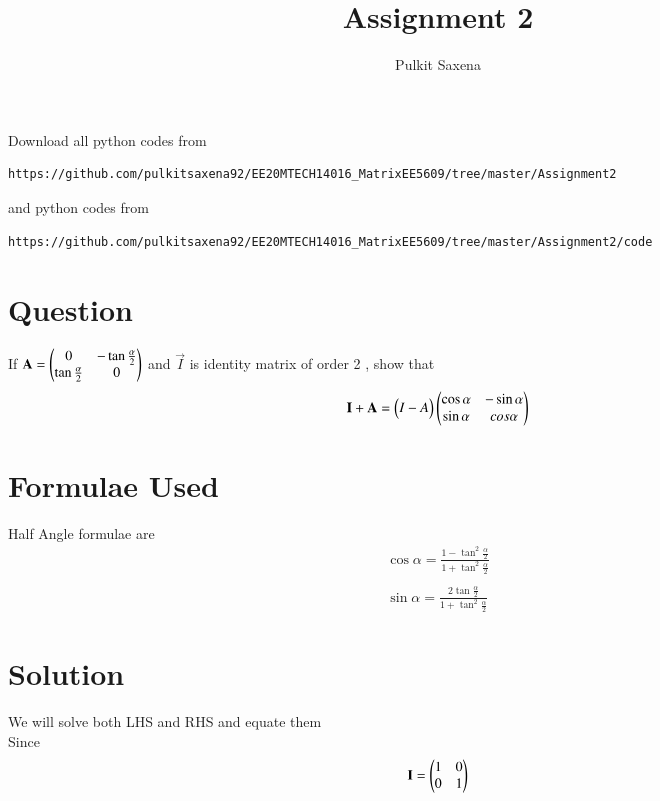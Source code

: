 \documentclass[journal,12pt,onecolumn]{IEEEtran}
\begin{document}
     \def\rightbox#1{\makebox[0in][r]{#1}}
     \def\centbox#1{\makebox[0in]{#1}}
     \def\topbox#1{\raisebox{-\baselineskip}[0in][0in]{#1}}
     \def\midbox#1{\raisebox{-0.5\baselineskip}[0in][0in]{#1}}
\vspace{3cm}
\title{Assignment 2}
\author{Pulkit Saxena}
\maketitle
\bigskip
\renewcommand{\thefigure}{1}
\renewcommand{\thetable}{\theenumi}
Download all python codes from 
\begin{lstlisting}
https://github.com/pulkitsaxena92/EE20MTECH14016_MatrixEE5609/tree/master/Assignment2
\end{lstlisting}
%
and python codes from 
%
\begin{lstlisting}
https://github.com/pulkitsaxena92/EE20MTECH14016_MatrixEE5609/tree/master/Assignment2/code
\end{lstlisting}
\section{\textbf{Question}}
If $\mathbf{A}=\begin{pmatrix}0 & -\tan\frac{\alpha}{2} \\ \tan\frac{\alpha}{2} & 0 \end{pmatrix}$ and $\vec{I}$ is identity matrix of order 2 , show that
\begin{align}
  \mathbf{I}+\mathbf{A}=\begin{pmatrix}I-A\end{pmatrix}\begin{pmatrix}\cos\alpha & -\sin\alpha \\ \sin\alpha & cos\alpha\end{pmatrix}
\end{align}
\section{\textbf{Formulae Used}}
Half Angle formulae are
\begin{align}
\cos\alpha=\frac{1-\tan^2\frac{\alpha}{2}}{1+\tan^2\frac{\alpha}{2}}\\ \\
\sin\alpha=\frac{2\tan\frac{\alpha}{2}}{1+\tan^2\frac{\alpha}{2}}
\end{align}


\section{\textbf{Solution}}
We will solve both LHS and RHS and equate them\\
Since 
\begin{align}
    \mathbf{I}=\begin{pmatrix}1 & 0\\ 0 & 1\end{pmatrix}
\end{align}
\end{document}
